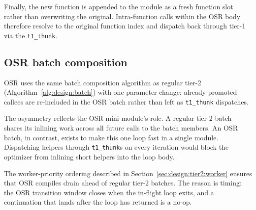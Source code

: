 Finally, the new function is appended to the module as a fresh function slot rather than overwriting the original. Intra-function calls within the OSR body therefore resolve to the original function index and dispatch back through tier-1 via the \texttt{t1\_thunk}.

\subsection{OSR batch composition}
\label{sec:design:osr:batch}

OSR uses the same batch composition algorithm as regular tier-2 (Algorithm~\ref{alg:design:batch}) with one parameter change: already-promoted callees are re-included in the OSR batch rather than left as \texttt{t1\_thunk} dispatches.

The asymmetry reflects the OSR mini-module's role. A regular tier-2 batch shares its inlining work across all future calls to the batch members. An OSR batch, in contrast, exists to make this one loop fast in a single module. Dispatching helpers through \texttt{t1\_thunk}s on every iteration would block the optimizer from inlining short helpers into the loop body.

The worker-priority ordering described in Section~\ref{sec:design:tier2:worker} ensures that OSR compiles drain ahead of regular tier-2 batches. The reason is timing: the OSR transition window closes when the in-flight loop exits, and a continuation that lands after the loop has returned is a no-op.
